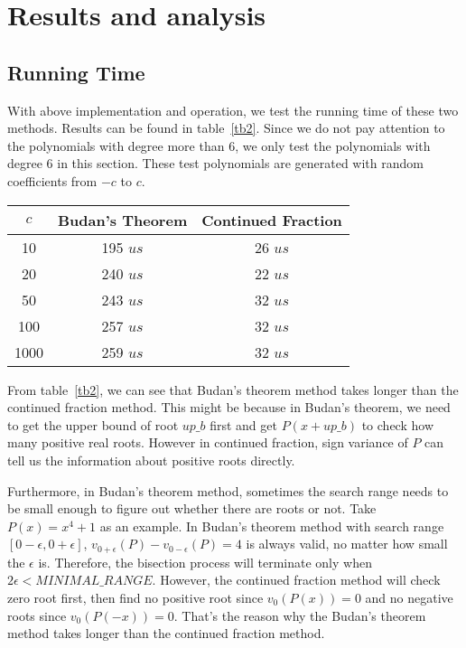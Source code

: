 \section{Results and analysis} \label{analysis}

\subsection{Running Time}

With above implementation and operation, we test the running time of these two
methods. Results can be found in table~\ref{tb2}. Since we do not pay attention
to the polynomials with degree more than 6, we only test the polynomials with
degree 6 in this section. These test polynomials are generated with random
coefficients from $-c$ to $c$. 

\begin{center}
\label{tb2}
\begin{tabular}{ |c|c|c| } 
 \hline

 $c$  & Budan's Theorem & Continued Fraction\\ 

 \hline
 10   & 195 $us$  & 26 $us$\\ 
 20   & 240 $us$  & 22 $us$\\ 
 50   & 243 $us$  & 32 $us$\\ 
 100   & 257 $us$  & 32 $us$\\ 
 1000   & 259 $us$  & 32 $us$\\ 
 \hline
\end{tabular}
\end{center}

From table~\ref{tb2}, we can see that Budan's theorem method takes longer than
the continued fraction method. This might be because in Budan’s theorem, we need
to get the upper bound of root $up\_b$ first and get $P(x+up\_b)$ to check how
many positive real roots. However in continued fraction, sign variance of $P$
can tell us the information about positive roots directly. 

Furthermore, in Budan's theorem method, sometimes the search range needs to be
small enough to figure out whether there are roots or not. Take $P(x) = x^4 +1 $
as an example. In Budan's theorem method with search range $[0-\epsilon,
0+\epsilon]$, $v_{0+\epsilon}(P) - v_{0-\epsilon}(P) = 4$ is always valid, no
matter how small the $\epsilon$ is. Therefore, the bisection process will
terminate only when $2\epsilon < MINIMAL\_RANGE$. However, the continued
fraction method will check zero root first, then find no positive root since
$v_0(P(x)) = 0$ and no negative roots since $v_0(P(-x))=0$. That's the reason
why the Budan’s theorem method takes longer than the continued fraction method.

